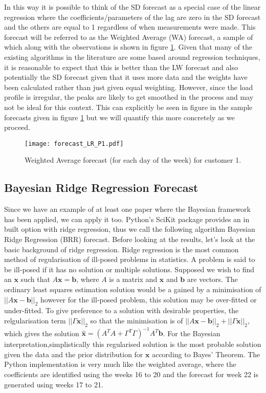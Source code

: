 In this way it is possible to think of the SD forecast as a special case of the linear regression where the coefficients/parameters of the lag are zero in the SD forecast and the others are equal to 1 regardless of when measurements were made. This forecast will be referred to as the Weighted Average (WA) forecast, a sample of which along with the observations is shown in figure \ref{fig:LR_forecast_P1}. Given that many of the existing algorithms in the literature are some based around regression techniques, it is reasonable to expect that this is better than the LW forecast and also potentially the SD forecast given that it uses more data and the weights have been calculated rather than just given equal weighting. However, since the load profile is irregular, the peaks are likely to get smoothed in the process and may not be ideal for this context. This can explicitly be seen in figure in the sample forecasts given in figure \ref{fig:LR_forecast_P1} but we will quantify this more concretely as we proceed. %
\begin{figure}
\centering
\texttt{[image: forecast\_LR\_P1.pdf]}
\caption{Weighted Average forecast (for each day of the week) for customer 1.}
\label{fig:LR_forecast_P1} 
\end{figure}

\subsection{Bayesian Ridge Regression Forecast} %

Since we have an example of at least one paper \citep{douglas98} where the Bayesian framework has been applied, we can apply it too. Python's SciKit package provides an in built option with ridge regression, thus we call the following algorithm Bayesian Ridge Regression (BRR) forecast. Before looking at the results, let's look at the basic background of ridge regression. Ridge regression is the most common method of regularisation of ill-posed problems in statistics. A problem is said to be ill-posed if it has no solution or multiple solutions. Supposed we wish to find an $\boldsymbol{x}$ such that $A\boldsymbol{x}=\boldsymbol{b}$, where $A$ is a matrix and $\boldsymbol{x}$ and $\boldsymbol{b}$ are vectors. The ordinary least squares estimation solution would be a gained by a minimisation of $||A\boldsymbol{x} - \boldsymbol{b}||_2$ however for the ill-posed problem, this solution may be over-fitted or under-fitted. To give preference to a solution with desirable properties, the relgularisation term $||\Gamma\boldsymbol{x}||_2$ so that the minimisation is of $||A\boldsymbol{x} - \boldsymbol{b}||_2 + ||\Gamma\boldsymbol{x}||_2$, which gives the solution $\hat{\boldsymbol{x}} = \left(A^T A + \Gamma^T \Gamma \right)^{-1} A^T \boldsymbol{b}$. For the Bayesian interpretation,simplistically this regularised solution is the most probable solution given the data and the prior distribution for $\boldsymbol{x}$ according to Bayes' Theorem. The Python implementation is very much like the weighted average, where the coefficients are identified using the weeks 16 to 20 and the forecast for week 22 is generated using weeks 17 to 21.

